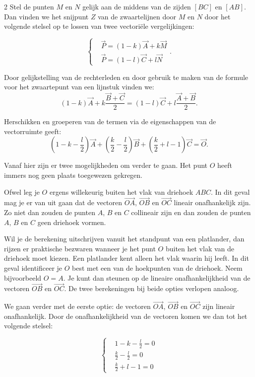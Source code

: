 \begin{multicols}{2}
Stel de punten $M$ en $N$ gelijk aan de middens van de zijden $[BC]$ en $[AB]$. Dan vinden we het snijpunt $Z$ van de zwaartelijnen door $M$ en $N$ door het volgende stelsel op te lossen van twee vectoriële vergelijkingen:

\[ \left\{ 
	\begin{aligned}
	& \vec{P}=(1-k) \vec{A} + k \vec{M} \\
	& \vec{P}=(1-l) \vec{C} + l \vec{N}
	\end{aligned}
\right.. \]
 
 Door gelijkstelling van de rechterleden en door gebruik te maken van de formule voor het zwaartepunt van een lijnstuk vinden we:
 \[(1-k) \vec{A} + k \frac{\vec{B}+\vec{C}}{2}=(1-l) \vec{C} + l \frac{\vec{A}+\vec{B}}{2}.\]

Herschikken en groeperen van de termen via de eigenschappen van de vectorruimte geeft:
\[ \left( 1-k-\frac{l}{2} \right) \vec{A}+\left(\frac{k}{2}-\frac{l}{2}\right) \vec{B}+\left(\frac{k}{2}+l-1 \right) \vec{C}=\vec{O}.\]

Vanaf hier zijn er twee mogelijkheden om verder te gaan. Het punt $O$ heeft immers nog geen plaats toegewezen gekregen. 

Ofwel leg je $O$ ergens willekeurig buiten het vlak van driehoek $ABC$. In dit geval mag je er van uit gaan dat de vectoren $\vec{OA}$, $\vec{OB}$ en $\vec{OC}$ lineair onafhankelijk zijn. Zo niet dan zouden de punten $A$, $B$ en $C$ collineair zijn en dan zouden de punten $A$, $B$ en $C$ geen driehoek vormen.

Wil je de berekening uitschrijven vanuit het standpunt van een platlander, dan rijzen er praktische bezwaren wanneer je het punt $O$ buiten het vlak van de driehoek moet kiezen. Een platlander kent alleen het vlak waarin hij leeft. In dit geval identificeer je $O$ best met een van de hoekpunten van de driehoek. Neem bijvoorbeeld $O=A$. Je kunt dan steunen op de lineaire onafhankelijkheid van de vectoren $\vec{OB}$ en $\vec{OC}$. De twee berekeningen bij beide opties verlopen analoog.

We gaan verder met de eerste optie: de vectoren $\vec{OA}$, $\vec{OB}$ en $\vec{OC}$ zijn lineair onafhankelijk. Door de onafhankelijkheid van de vectoren komen we dan tot het volgende stelsel:

\[ \left\{ 
	\begin{aligned}
	& 1-k-\frac{l}{2} =0 \\
	& \frac{k}{2}-\frac{l}{2}=0 \\
	& \frac{k}{2}+l-1=0
	\end{aligned}
\right. \]


\end{multicols}
